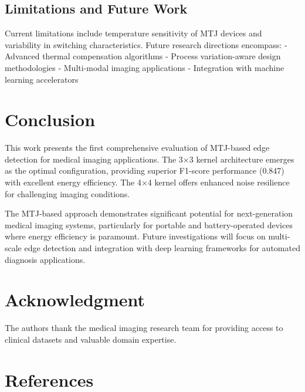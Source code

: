 \documentclass[conference]{IEEEtran}
\begin{document}
\subsection{Limitations and Future Work}

Current limitations include temperature sensitivity of MTJ devices and variability in switching characteristics. Future research directions encompass:
- Advanced thermal compensation algorithms
- Process variation-aware design methodologies
- Multi-modal imaging applications
- Integration with machine learning accelerators

\section{Conclusion}

This work presents the first comprehensive evaluation of MTJ-based edge detection for medical imaging applications. The 3×3 kernel architecture emerges as the optimal configuration, providing superior F1-score performance (0.847) with excellent energy efficiency. The 4×4 kernel offers enhanced noise resilience for challenging imaging conditions.

The MTJ-based approach demonstrates significant potential for next-generation medical imaging systems, particularly for portable and battery-operated devices where energy efficiency is paramount. Future investigations will focus on multi-scale edge detection and integration with deep learning frameworks for automated diagnosis applications.

\section*{Acknowledgment}

The authors thank the medical imaging research team for providing access to clinical datasets and valuable domain expertise.

\section*{References}
\end{document}
